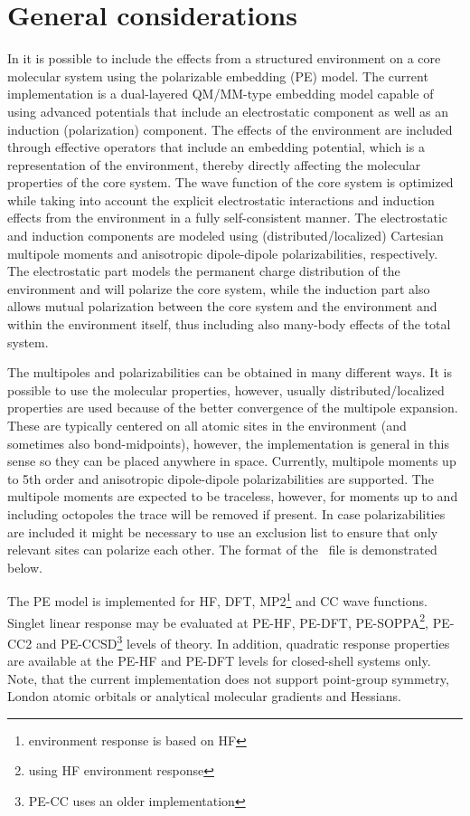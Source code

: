 \section{General considerations}
In {\dalton} it is possible to include the effects from a structured environment on a core molecular system using the polarizable embedding (PE) model. The current implementation is a dual-layered QM/MM-type embedding model capable of using advanced potentials that include an electrostatic component as well as an induction (polarization) component. The effects of the environment are included through effective operators that include an embedding potential, which is a representation of the environment, thereby directly affecting the molecular properties of the core system. The wave function of the core system is optimized while taking into account the explicit electrostatic interactions and induction effects from the environment in a fully self-consistent manner. The electrostatic and induction components are modeled using (distributed/localized) Cartesian multipole moments and anisotropic dipole-dipole polarizabilities, respectively. The electrostatic part models the permanent charge distribution of the environment and will polarize the core system, while the induction part also allows mutual polarization between the core system and the environment and within the environment itself, thus including also many-body effects of the total system.

The multipoles and polarizabilities can be obtained in many different ways. It is possible to use the molecular properties, however, usually distributed/localized properties are used because of the better convergence of the multipole expansion. These are typically centered on all atomic sites in the environment (and sometimes also bond-midpoints), however, the implementation is general in this sense so they can be placed anywhere in space. Currently, multipole moments up to 5th order and anisotropic dipole-dipole polarizabilities are supported. The multipole moments are expected to be traceless, however, for moments up to and including octopoles the trace will be removed if present. In case polarizabilities are included it might be necessary to use an exclusion list to ensure that only relevant sites can polarize each other. The format of the \potinp\ file is demonstrated below.

The PE model is implemented for HF, DFT, MP2\footnote{environment response is based on HF} and CC wave functions. Singlet linear response may be evaluated at PE-HF, PE-DFT, PE-SOPPA\footnote{using HF environment response}, PE-CC2 and PE-CCSD\footnote{PE-CC uses an older implementation} levels of theory. In addition, quadratic response properties are available at the PE-HF and PE-DFT levels for closed-shell systems only. Note, that the current implementation does not support point-group symmetry, London atomic orbitals or analytical molecular gradients and Hessians.


